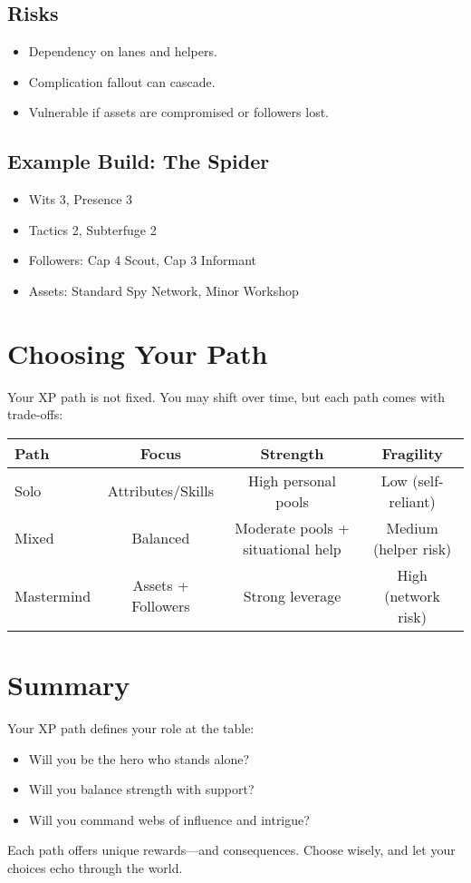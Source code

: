 \subsection*{Risks}
\begin{itemize}
  \item Dependency on lanes and helpers.
  \item Complication fallout can cascade.
  \item Vulnerable if assets are compromised or followers lost.
\end{itemize}

\subsection*{Example Build: The Spider}
\begin{itemize}
  \item Wits 3, Presence 3
  \item Tactics 2, Subterfuge 2
  \item Followers: Cap 4 Scout, Cap 3 Informant
  \item Assets: Standard Spy Network, Minor Workshop
\end{itemize}

\section{Choosing Your Path}

Your XP path is not fixed. You may shift over time, but each path comes with trade-offs:

\begin{center}
\begin{tabular}{lccc}
\toprule
\textbf{Path} & \textbf{Focus} & \textbf{Strength} & \textbf{Fragility} \\
\midrule
Solo & Attributes/Skills & High personal pools & Low (self-reliant) \\
Mixed & Balanced & Moderate pools + situational help & Medium (helper risk) \\
Mastermind & Assets + Followers & Strong leverage & High (network risk) \\
\bottomrule
\end{tabular}
\end{center}

\section{Summary}

Your XP path defines your role at the table:

\begin{itemize}
  \item Will you be the hero who stands alone?
  \item Will you balance strength with support?
  \item Will you command webs of influence and intrigue?
\end{itemize}

Each path offers unique rewards—and consequences. Choose wisely, and let your choices echo through the world.

